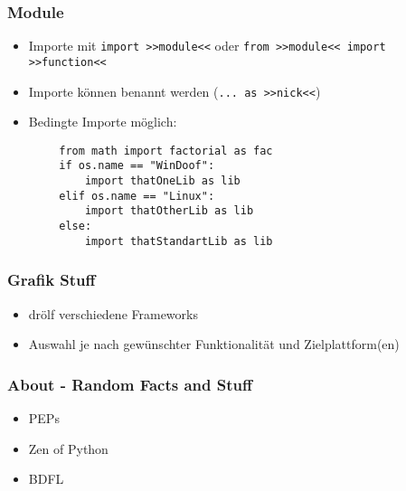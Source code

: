 \documentclass[handout]{beamer}
\begin{document}
\begin{frame}[fragile]
	\frametitle{Module}
	\begin{itemize}
		\item Importe mit \texttt{import >>module<<} oder \texttt{from >>module<< import >>function<<}
		\item Importe können benannt werden (\texttt{... as >>nick<<})
		\item Bedingte Importe möglich:
	\end{itemize}
	\begin{lstlisting}
		from math import factorial as fac
		if os.name == "WinDoof":
		    import thatOneLib as lib
		elif os.name == "Linux":
		    import thatOtherLib as lib
		else:
		    import thatStandartLib as lib
	\end{lstlisting}
\end{frame}

\begin{frame}
	\frametitle{Grafik Stuff}
	\begin{itemize}
		\item drölf verschiedene Frameworks
		\item Auswahl je nach gewünschter Funktionalität und Zielplattform(en)
	\end{itemize}
\end{frame}

\begin{frame}
	\frametitle{About - Random Facts and Stuff}
	\begin{itemize}
		\item PEPs
		\item Zen of Python
		\item BDFL
	\end{itemize}
\end{frame}
	
\end{document}
